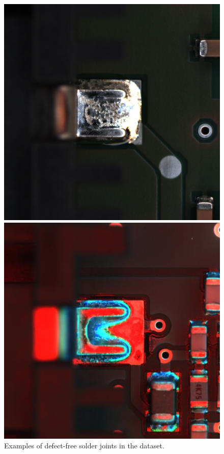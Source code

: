\begin{figure}[ht!]
    \centering
    \begin{minipage}{0.32\textwidth}
        \centering
        \includegraphics[width=\textwidth]{Images/train_FC_BF2003015014_1174_42_2038_2038_Color.jpg} %
    \end{minipage}
    \begin{minipage}{0.32\textwidth}
        \centering
        \includegraphics[width=\textwidth]{Images/Val_FC_heat_BF2003054784_4796_144_2042_2042_Multi.jpg} %
    \end{minipage}\hfill
    \caption{Examples of defect-free solder joints in the dataset.}
    \label{fig:dataset-FC}
\end{figure}

